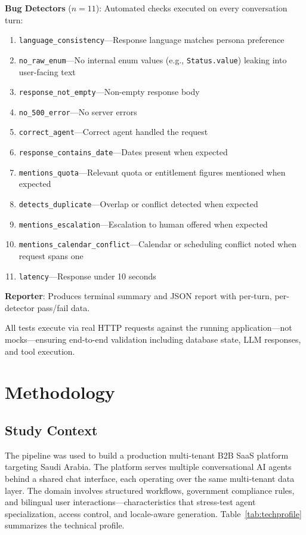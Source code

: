 \documentclass[11pt,a4paper]{article}
\begin{document}
\textbf{Bug Detectors} ($n=11$): Automated checks executed on every conversation turn:
\begin{enumerate}[leftmargin=*]
    \item \texttt{language\_consistency}---Response language matches persona preference
    \item \texttt{no\_raw\_enum}---No internal enum values (e.g., \texttt{Status.value}) leaking into user-facing text
    \item \texttt{response\_not\_empty}---Non-empty response body
    \item \texttt{no\_500\_error}---No server errors
    \item \texttt{correct\_agent}---Correct agent handled the request
    \item \texttt{response\_contains\_date}---Dates present when expected
    \item \texttt{mentions\_quota}---Relevant quota or entitlement figures mentioned when expected
    \item \texttt{detects\_duplicate}---Overlap or conflict detected when expected
    \item \texttt{mentions\_escalation}---Escalation to human offered when expected
    \item \texttt{mentions\_calendar\_conflict}---Calendar or scheduling conflict noted when request spans one
    \item \texttt{latency}---Response under 10 seconds
\end{enumerate}

\textbf{Reporter}: Produces terminal summary and JSON report with per-turn, per-detector pass/fail data.

All tests execute via real HTTP requests against the running application---not mocks---ensuring end-to-end validation including database state, LLM responses, and tool execution.

\section{Methodology}

\subsection{Study Context}

The pipeline was used to build a production multi-tenant B2B SaaS platform targeting Saudi Arabia. The platform serves multiple conversational AI agents behind a shared chat interface, each operating over the same multi-tenant data layer. The domain involves structured workflows, government compliance rules, and bilingual user interactions---characteristics that stress-test agent specialization, access control, and locale-aware generation. Table~\ref{tab:techprofile} summarizes the technical profile.
\end{document}
